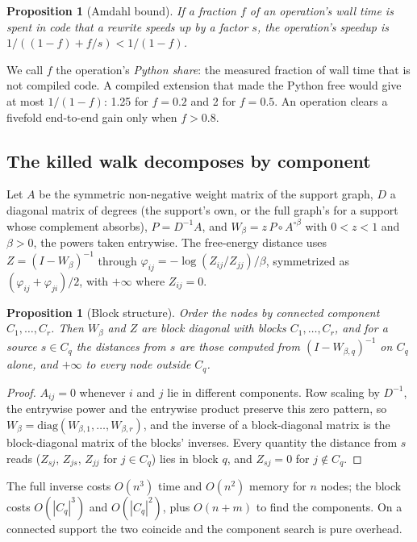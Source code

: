 \documentclass[11pt]{article}
\theoremstyle{plain}
\newtheorem{proposition}[theorem]{Proposition}
\theoremstyle{definition}
\theoremstyle{remark}
\begin{document}
\begin{proposition}[Amdahl bound]\label{prop:amdahl}
If a fraction $f$ of an operation's wall time is spent in code that a rewrite speeds up by a factor
$s$, the operation's speedup is $1/((1 - f) + f/s) < 1/(1 - f)$.
\end{proposition}

We call $f$ the operation's \emph{Python share}: the measured fraction of wall time that is not
compiled code. A compiled extension that made the Python free would give at most $1/(1-f)$: 1.25
for $f = 0.2$ and 2 for $f = 0.5$. An operation clears a fivefold end-to-end gain only when $f >
0.8$.

\subsection{The killed walk decomposes by component}

Let $A$ be the symmetric non-negative weight matrix of the support graph, $D$ a diagonal matrix of
degrees (the support's own, or the full graph's for a support whose complement absorbs), $P = D^{-1}
A$, and $W_\beta = z\, P \circ A^{\circ \beta}$ with $0 < z < 1$ and $\beta > 0$, the powers taken
entrywise. The free-energy distance uses $Z = (I - W_\beta)^{-1}$ through $\varphi_{ij} = -\log(Z_{ij} /
Z_{jj}) / \beta$, symmetrized as $(\varphi_{ij} + \varphi_{ji})/2$, with $+\infty$ where $Z_{ij} =
0$.

\begin{proposition}[Block structure]\label{prop:block}
Order the nodes by connected component $C_1, \dots, C_r$. Then $W_\beta$ and $Z$ are block diagonal
with blocks $C_1, \dots, C_r$, and for a source $s \in C_q$ the distances from $s$ are those
computed from $(I - W_{\beta, q})^{-1}$ on $C_q$ alone, and $+\infty$ to every node outside $C_q$.
\end{proposition}
\begin{proof}
$A_{ij} = 0$ whenever $i$ and $j$ lie in different components. Row scaling by $D^{-1}$, the entrywise
power and the entrywise product preserve this zero pattern, so $W_\beta = \mathrm{diag}(W_{\beta,1},
\dots, W_{\beta,r})$, and the inverse of a block-diagonal matrix is the block-diagonal matrix of the
blocks' inverses. Every quantity the distance from $s$ reads ($Z_{sj}$, $Z_{js}$, $Z_{jj}$ for $j
\in C_q$) lies in block $q$, and $Z_{sj} = 0$ for $j \notin C_q$.
\end{proof}

The full inverse costs $O(n^3)$ time and $O(n^2)$ memory for $n$ nodes; the block costs
$O(|C_q|^3)$ and $O(|C_q|^2)$, plus $O(n + m)$ to find the components. On a connected support the
two coincide and the component search is pure overhead.
\end{document}
